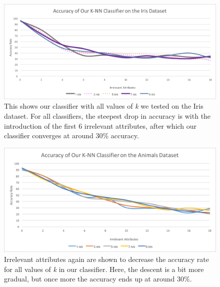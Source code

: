 \documentclass{article}
\begin{document}
\begin{figure}[hbt]
\centering
\includegraphics[scale=0.6]{our-knn-iris-full} 
\caption{This shows our classifier with all values of \textit{k} we tested on the Iris dataset. For all classifiers, the steepest drop in accuracy is with the introduction of the first 6 irrelevant attributes, after which our classifier converges at around 30\% accuracy.}
\end{figure}

\begin{figure}[hbt]
\centering
\includegraphics[scale=0.7]{our-knn-animals-full} 
\caption{Irrelevant attributes again are shown to decrease the accuracy rate for all values of \textit{k} in our classifier. Here, the descent is a bit more gradual, but once more the accuracy ends up at around 30\%.}
\end{figure}
\end{document}

